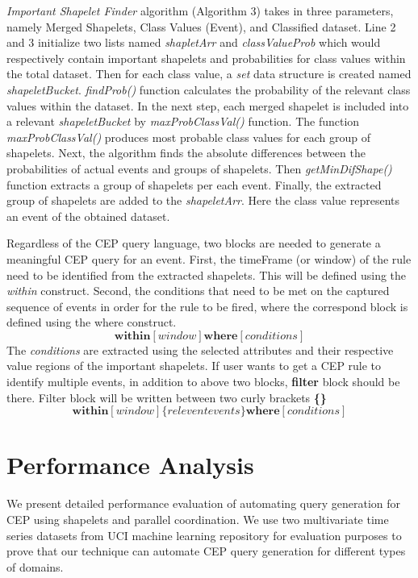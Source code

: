 \documentclass[conference]{IEEEtran}  %
\begin{document}
\textit{Important Shapelet Finder} algorithm (Algorithm 3) takes in three parameters, namely Merged Shapelets, Class Values (Event), and Classified dataset. Line 2 and 3 initialize two lists named \textit{shapletArr} and \textit{classValueProb} which would respectively contain important shapelets and probabilities for class values within the total dataset. Then for each class value, a \textit{set} data structure is created named \textit{shapeletBucket}. \textit{findProb()} function calculates the probability of the relevant class values within the dataset. In the next step, each merged shapelet is included into a relevant \textit{shapeletBucket} by \textit{maxProbClassVal()} function. The function \textit{maxProbClassVal()} produces most probable class values for each group of shapelets. Next, the algorithm finds the absolute differences between the probabilities of actual events and groups of shapelets. Then \textit{getMinDifShape()} function extracts a group of shapelets per each event. Finally, the extracted group of shapelets are added to the \textit{shapeletArr}. Here the class value represents an event of the obtained dataset.

Regardless of the CEP query language, two blocks are needed to generate a meaningful CEP query for an event. First, the timeFrame (or window) of the rule need to be identified from the extracted shapelets. This will be defined using the \textit{within} construct. Second, the conditions that need to be met on the captured sequence of events in order for the rule to be fired, where the correspond block is defined using the where construct. 
\vspace{0.1cm}
\begin{equation}
\textbf{within}[window] \textbf{where}[conditions]
\label{eq:withinWhere}
\end{equation}
 The \textit{conditions} are extracted using the selected attributes and their respective value regions of the important shapelets. If user wants to get a CEP rule to identify multiple events, in addition to above two blocks, \textbf{filter} block should be there. Filter block will be written between two curly brackets \textbf{\{\}}
\begin{equation}
\textbf{within}[window] \{relevent events\} \textbf{where}[conditions]
\label{eq:releventEvents}
\end{equation}
\section{Performance Analysis}
We present detailed performance evaluation of automating query generation for CEP using shapelets and parallel coordination. We use two multivariate time series datasets from UCI machine learning repository \cite{IEEEexample:Ocupancy,IEEEexample:EEG} for evaluation purposes to prove that our technique can automate CEP query generation for different types of domains.
\end{document}
